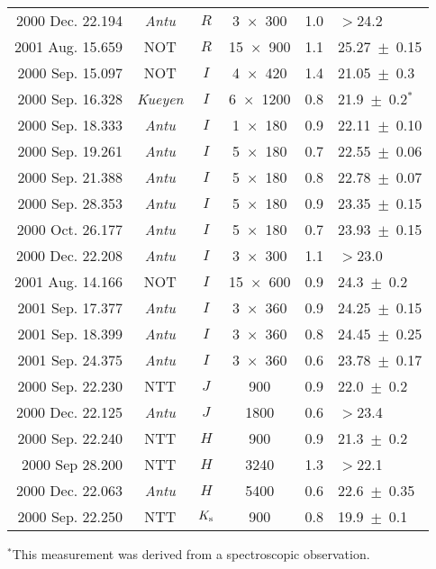 \begin{table}
{\begin{tabular}{rccccl}
2000 Dec. 22.194 & {\it Antu}   & $R$ &  3~$\times$~300 & 1.0 & 
$>$24.2\\
2001 Aug. 15.659 & NOT          & $R$ & 15~$\times$~900 & 1.1 &
25.27~$\pm$~0.15\\
2000 Sep. 15.097 & NOT          & $I$ &  4~$\times$~420 & 1.4 &
21.05~$\pm$~0.3\\
2000 Sep. 16.328 & {\it Kueyen} & $I$ & 6~$\times$~1200 & 0.8 &
21.9~$\pm$~0.2$^*$\\ 
2000 Sep. 18.333 & {\it Antu}   & $I$ &  1~$\times$~180 & 0.9 &
22.11~$\pm$~0.10\\
2000 Sep. 19.261 & {\it Antu}   & $I$ &  5~$\times$~180 & 0.7 &
22.55~$\pm$~0.06\\
2000 Sep. 21.388 & {\it Antu}   & $I$ &  5~$\times$~180 & 0.8 &
22.78~$\pm$~0.07\\
2000 Sep. 28.353 & {\it Antu}   & $I$ &  5~$\times$~180 & 0.9 &
23.35~$\pm$~0.15\\
2000 Oct. 26.177 & {\it Antu}   & $I$ &  5~$\times$~180 & 0.7 &
23.93~$\pm$~0.15\\
2000 Dec. 22.208 & {\it Antu}   & $I$ &  3~$\times$~300 & 1.1 &
$>$23.0\\
2001 Aug. 14.166 & NOT          & $I$ & 15~$\times$~600 & 0.9 &
24.3~$\pm$~0.2\\
2001 Sep. 17.377 & {\it Antu}   & $I$ &  3~$\times$~360 & 0.9 &
24.25~$\pm$~0.15\\
2001 Sep. 18.399 & {\it Antu}   & $I$ &  3~$\times$~360 & 0.8 &
24.45~$\pm$~0.25\\
2001 Sep. 24.375 & {\it Antu}   & $I$ &  3~$\times$~360 & 0.6 &
23.78~$\pm$~0.17\\
2000 Sep. 22.230 & NTT          & $J$ &           900 & 0.9 &
22.0~$\pm$~0.2\\
2000 Dec. 22.125 & {\it Antu}   & $J$ &          1800 & 0.6 &
$>$23.4\\
2000 Sep. 22.240 & NTT          & $H$ &           900 & 0.9 &
21.3~$\pm$~0.2\\
2000 Sep 28.200 & NTT          & $H$ &          3240 & 1.3 & 
$>$22.1\\
2000 Dec. 22.063 & {\it Antu}   & $H$ &          5400 & 0.6 &
22.6~$\pm$~0.35\\
2000 Sep. 22.250 & NTT         & $K_{\rm s}$ &          900 & 0.8 &
19.9~$\pm$~0.1\\
\hline\end{tabular}}
\smallskip
 $^*$This measurement was derived from a spectroscopic
observation.
\end{table}